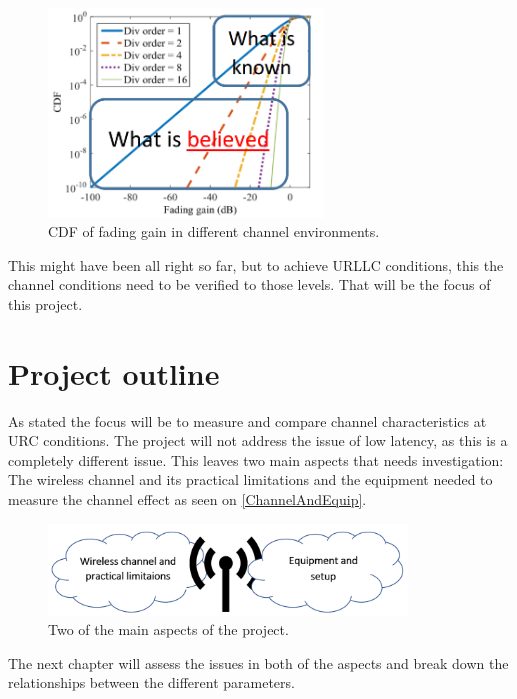 \begin{figure}[H]
\centering
\includegraphics[width=0.65\textwidth]{figures/fading_gain.png}
\caption{\Gls{CDF} of fading gain in different channel environments.}
\label{fading_gain}
\end{figure}

This might have been all right so far, but to achieve URLLC conditions, this the channel conditions need to be verified to those levels. That will be the focus of this project.


\section{Project outline}

As stated the focus will be to measure and compare channel characteristics at \gls{URC} conditions. The project will not address the issue of low latency, as this is a completely different issue. This leaves two main aspects that needs investigation: The wireless channel and its practical limitations and the equipment needed to measure the channel effect as seen on \autoref{ChannelAndEquip}.

\begin{figure}[H]
\centering
\includegraphics[width=0.85\textwidth]{figures/ProOutline.png}
\caption{Two of the main aspects of the project.}
\label{ChannelAndEquip}
\end{figure}

The next chapter will assess the issues in both of the aspects and break down the relationships between the different parameters.  




